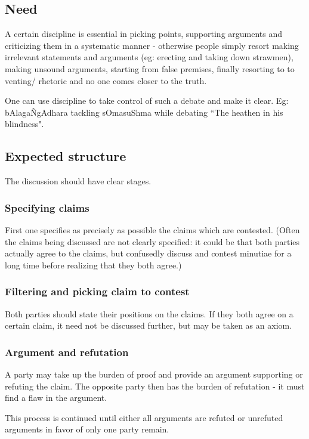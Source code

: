 \documentclass[oneside, article]{memoir}
\begin{document}
\subsection{Need}
A certain discipline is essential in picking points, supporting arguments and criticizing them in a systematic manner - otherwise people simply resort making irrelevant statements and arguments (eg: erecting and taking down strawmen), making unsound arguments, starting from false premises, finally resorting to to venting/ rhetoric and no one comes closer to the truth.

One can use discipline to take control of such a debate and make it clear. Eg: bAlaga\~NgAdhara tackling sOmasuShma while debating ``The heathen in his blindness".

\subsection{Expected structure}
The discussion should have clear stages.

\subsubsection{Specifying claims}
First one specifies as precisely as possible the claims which are contested. (Often the claims being discussed are not clearly specified: it could be that both parties actually agree to the claims, but confusedly discuss and contest minutiae for a long time before realizing that they both agree.)

\subsubsection{Filtering and picking claim to contest}
Both parties should state their positions on the claims. If they both agree on a certain claim, it need not be discussed further, but may be taken as an axiom.

\subsubsection{Argument and refutation}
A party may take up the burden of proof and provide an argument supporting or refuting the claim. The opposite party then has the burden of refutation - it must find a flaw in the argument.

This process is continued until either all arguments are refuted or unrefuted arguments in favor of only one party remain.
\end{document}
